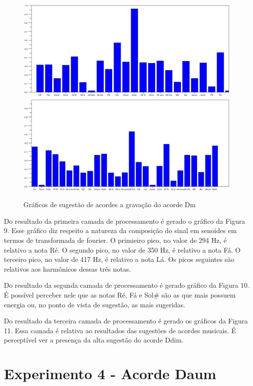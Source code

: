 \begin{figure}[h]
	\centering
		\includegraphics[keepaspectratio=true,scale=0.49]{figuras/Dm/acordes_1_Ddim.eps}
		\includegraphics[keepaspectratio=true,scale=0.49]{figuras/Dm/acordes_2_Ddim.eps}
	\caption{Gráficos de sugestão de acordes a gravação do acorde Dm}
\end{figure}
\newpage

Do resultado da primeira camada de processamento é gerado o gráfico da Figura 9. Esse gráfico diz respeito a natureza da composição do sinal em senoides em termos de transformada de fourier. O primieiro pico, no valor de 294 Hz, é relativo a nota Ré. O segundo pico, no valor de 350 Hz, é relativo a nota Fá. O terceiro pico, no valor de 417 Hz, é relativo a nota Lá. Os picos seguintes são relativos aos harmônicos dessas três notas. 

Do resultado da segunda camada de processamento é gerado gráfico da Figura 10. É possível perceber nele que as notas Ré, Fá e Sol\# são as que mais possuem energia ou, no ponto de vista de sugestão, as mais sugeridas.

Do resultado da terceira camada de processamento é gerado os gráficos da Figura 11. Essa camada é relativa ao resultados das sugestões de acordes musicais. É perceptível ver a presença da alta sugestão do acorde Ddim.

\section{Experimento 4 - Acorde Daum}
\label{sec:experimento4}

